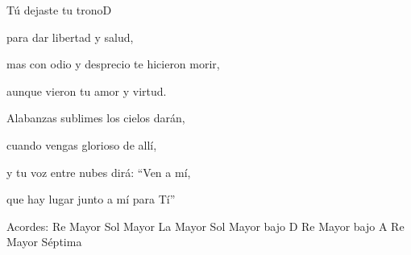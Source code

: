 \documentclass[12pt, spanish]{book}
\begin{document}
\begin{song}{Tú dejaste tu trono}{D}
\begin{SBOpGroup}
            para dar libertad y salud,

            mas con odio y desprecio te hicieron morir,

            aunque vieron tu amor y virtud.
        \end{SBOpGroup}
        \vskip 20pt
        \begin{SBOpGroup}
            Alabanzas sublimes los cielos darán,

            cuando vengas glorioso de allí,

            y tu voz entre nubes dirá: \textquotedblleft Ven a mí,

            que hay lugar junto a mí para Tí\textquotedblright
        \end{SBOpGroup}

        \ifChordBk
        \begin{SBOpGroup}
            Acordes:\break
            \upchord{\D}\qquad Re Mayor \hfill
            \upchord{\G}\qquad Sol Mayor \hfill\null\break
            \upchord{\A}\qquad La Mayor \hfill
            \upchord{\GD}\qquad Sol Mayor bajo D \hfill\null\break
            \upchord{\DA}\qquad Re Mayor bajo A \hfill
            \upchord{\Dseven}\qquad Re Mayor S\'eptima \hfill\null\break
        \end{SBOpGroup}
        \fi
    \end{song}

    \ifChordBk
        
        \theendnotes
        
        
        
    \fi

    
\end{document}
